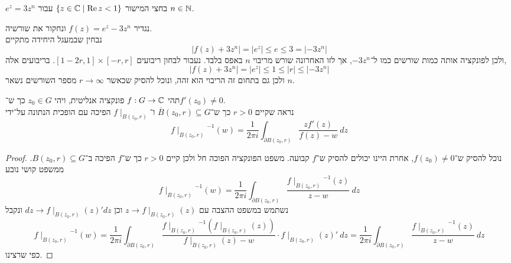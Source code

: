 \subquestion{}
$e^z = 3z^n$ בחצי המישור $\{ z \in \mathbb{C} \mid \operatorname{Re} z < 1 \}$ עבור $n \in \mathbb{N}$.
\begin{solution}
	נגדיר $f(z) = e^z - 3z^n$ ונחקור את שורשיה. \\
	נבחין שבמעגל היחידה מתקיים
	\[
		|f(z) + 3z^n|
		= |e^z|
		\le e
		\le 3
		= |-3z^n|
	\]
	ולכן לפונקציה אותה כמות שורשים כמו ל־$-3z^n$, אך לזו האחרונה שורש מריבוי $n$ באפס בלבד.
	נעבור לבחון ריבועים $[1 - 2r, 1] \times [-r, r]$.
	בריבועים אלה,
	\[
		|f(z) + 3z^n|
		= |e^z|
		\le 1
		\le |r|
		\le |-3z^n|
	\]
	ולכן גם בתחום זה הריבוי הוא זהה, ונוכל להסיק שכאשר $r \to \infty$ מספר השורשים נשאר $n$.
\end{solution}

\question{}
תהי $f : G \to \mathbb{C}$ פונקציה אנליטית, ויהי $z_0 \in G$ כך ש־$f'(z_0) \ne 0$. \\
נראה שקיים $r > 0$ כך ש־$\overline{B}(z_0, r) \subseteq G$ ו־$f \mid_{B(z_0, r)}$ הפיכה עם הופכית הנתונה על־ידי
\[
	{f \mid_{B(z_0, r)}}^{-1}(w)
	= \frac{1}{2\pi i} \int_{\partial B(z_0, r)} \frac{z f'(z)}{f(z) - w}\ dz
\]
\begin{proof}
	נוכל להסיק ש־$f(z_0) \ne 0$, אחרת היינו יכולים להסיק ש־$f$ קבועה.
	משפט הפונקציה הפוכה חל ולכן קיים $r > 0$ כך ש־$f$ הפיכה ב־$B(z_0, r) \subseteq G$.
	ממשפט קושי נובע
	\[
		{f \mid_{B(z_0, r)}}^{-1}(w)
		= \frac{1}{2\pi i} \int_{\partial B(z_0, r)} \frac{{f \mid_{B(z_0, r)}}^{-1}(z)}{z - w}\ dz
	\]
	נשתמש במשפט ההצבה עם $z \rightarrow f \mid_{B(z_0, r)}(z)$ וכן $dz \rightarrow f \mid_{B(z_0, r)}(z)' dz$ ונקבל
	\[
		{f \mid_{B(z_0, r)}}^{-1}(w)
		= \frac{1}{2\pi i} \int_{\partial B(z_0, r)} \frac{{f \mid_{B(z_0, r)}}^{-1}(f \mid_{B(z_0, r)}(z))}{f \mid_{B(z_0, r)}(z) - w} \cdot f \mid_{B(z_0, r)}(z)'\ dz
		= \frac{1}{2\pi i} \int_{\partial B(z_0, r)} \frac{{f \mid_{B(z_0, r)}}^{-1}(z)}{z - w}\ dz
	\]
	כפי שרצינו.
\end{proof}

